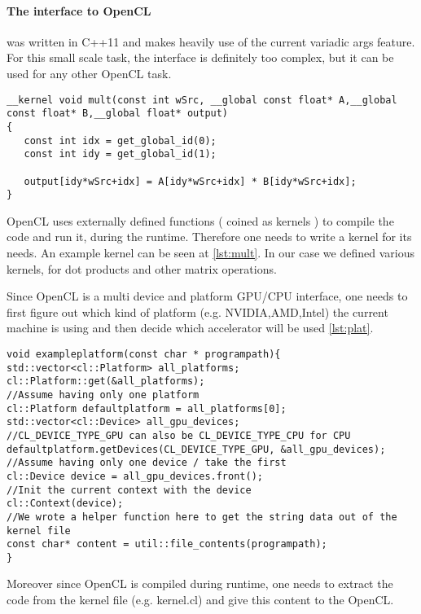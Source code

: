 \documentclass{acm_proc_article-sp}
\begin{document}
\paragraph{The interface to OpenCL} was written in C++11 and makes heavily use of the current variadic args feature. For this small scale task, the interface is definitely too complex, but it can be used for any other OpenCL task.

\label{lst:mult}
\begin{lstlisting}[caption=Example Kernel function]
__kernel void mult(const int wSrc, __global const float* A,__global const float* B,__global float* output)
{
   const int idx = get_global_id(0);
   const int idy = get_global_id(1);

   output[idy*wSrc+idx] = A[idy*wSrc+idx] * B[idy*wSrc+idx];
}
\end{lstlisting}
OpenCL uses externally defined functions ( coined as kernels ) to compile the code and run it, during the runtime. Therefore one needs to write a kernel for its needs. An example kernel can be seen at \ref{lst:mult}. In our case we defined various kernels, for dot products and other matrix operations.

Since OpenCL is a multi device and platform GPU/CPU interface, one needs to first figure out which kind of platform (e.g. NVIDIA,AMD,Intel) the current machine is using and then decide which accelerator will be used \ref{lst:plat}.

\label{lst:plat}
\begin{lstlisting}[caption=Get Platforms and devices]
void exampleplatform(const char * programpath){
std::vector<cl::Platform> all_platforms;
cl::Platform::get(&all_platforms);
//Assume having only one platform
cl::Platform defaultplatform = all_platforms[0];
std::vector<cl::Device> all_gpu_devices;
//CL_DEVICE_TYPE_GPU can also be CL_DEVICE_TYPE_CPU for CPU
defaultplatform.getDevices(CL_DEVICE_TYPE_GPU, &all_gpu_devices);
//Assume having only one device / take the first
cl::Device device = all_gpu_devices.front();
//Init the current context with the device
cl::Context(device);
//We wrote a helper function here to get the string data out of the kernel file
const char* content = util::file_contents(programpath);
}
\end{lstlisting}


Moreover since OpenCL is compiled during runtime, one needs to extract the code from the kernel file (e.g. kernel.cl) and give this content to the OpenCL.
\end{document}
